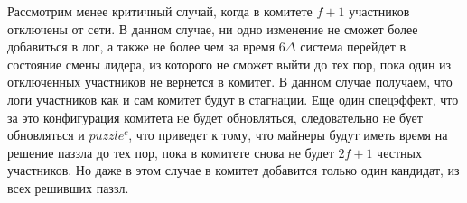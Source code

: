 Рассмотрим менее критичный случай, когда в комитете $f+1$ участников отключены от сети. В данном случае, ни одно изменение не сможет более добавиться в лог, а также не более чем за время $6\Delta$ система перейдет в состояние смены лидера, из которого не сможет выйти до тех пор, пока один из отключенных участников не вернется в комитет. В данном случае получаем, что логи участников как и сам комитет будут в стагнации. Еще один спецэффект, что за это конфигурация комитета не будет обновляться, следовательно не бует обновляться и $puzzle^c$, что приведет к тому, что майнеры будут иметь время на решение паззла до тех пор, пока в комитете снова не будет $2f+1$ честных участников. Но даже в этом случае в комитет добавится только один кандидат, из всех решивших паззл.